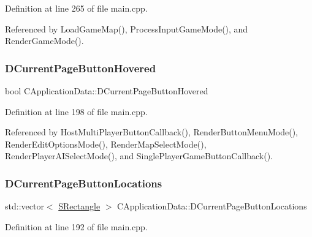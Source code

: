 Definition at line 265 of file main.\+cpp.



Referenced by Load\+Game\+Map(), Process\+Input\+Game\+Mode(), and Render\+Game\+Mode().

\hypertarget{classCApplicationData_a96b3a9b5c9965540007dff3fa85587fa}{}\label{classCApplicationData_a96b3a9b5c9965540007dff3fa85587fa} 
\subsubsection{\texorpdfstring{D\+Current\+Page\+Button\+Hovered}{DCurrentPageButtonHovered}}
{\footnotesize\ttfamily bool C\+Application\+Data\+::\+D\+Current\+Page\+Button\+Hovered\hspace{0.3cm}{\ttfamily [protected]}}



Definition at line 198 of file main.\+cpp.



Referenced by Host\+Multi\+Player\+Button\+Callback(), Render\+Button\+Menu\+Mode(), Render\+Edit\+Options\+Mode(), Render\+Map\+Select\+Mode(), Render\+Player\+A\+I\+Select\+Mode(), and Single\+Player\+Game\+Button\+Callback().

\hypertarget{classCApplicationData_a3615df8e23cea3ce17f11cf61340a7b4}{}\label{classCApplicationData_a3615df8e23cea3ce17f11cf61340a7b4} 
\subsubsection{\texorpdfstring{D\+Current\+Page\+Button\+Locations}{DCurrentPageButtonLocations}}
{\footnotesize\ttfamily std\+::vector$<$ \hyperlink{structSRectangle}{S\+Rectangle} $>$ C\+Application\+Data\+::\+D\+Current\+Page\+Button\+Locations\hspace{0.3cm}{\ttfamily [protected]}}



Definition at line 192 of file main.\+cpp.



